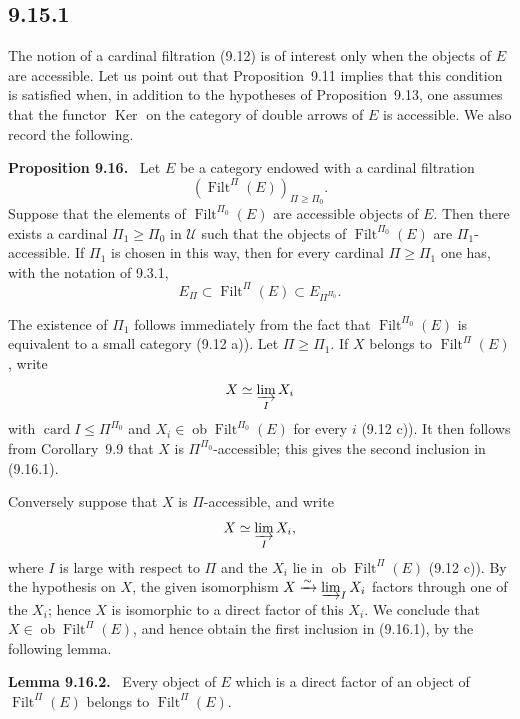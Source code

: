 \documentclass[11pt]{article}
\newcommand{\U}{\mathcal{U}}
\newcommand{\ob}{\operatorname{ob}}
\newcommand{\Filt}{\operatorname{Filt}}
\newcommand{\Ker}{\operatorname{Ker}}
\newcommand{\card}{\operatorname{card}}
\newcommand{\xto}[1]{\xrightarrow{#1}}
\newenvironment{statement}[1]{\par\medskip\noindent\textbf{#1.}\ }{\par\medskip}
\begin{document}
\subsection*{9.15.1}

The notion of a cardinal filtration (9.12) is of interest only when the objects of $E$ are accessible. Let us point out that Proposition~9.11 implies that this condition is satisfied when, in addition to the hypotheses of Proposition~9.13, one assumes that the functor $\Ker$ on the category of double arrows of $E$ is accessible. We also record the following.

\begin{statement}{Proposition 9.16}
Let $E$ be a category endowed with a cardinal filtration
\[
(\Filt^\Pi(E))_{\Pi\geq\Pi_0}.
\]
Suppose that the elements of $\Filt^{\Pi_0}(E)$ are accessible objects of $E$. Then there exists a cardinal $\Pi_1\geq\Pi_0$ in $\U$ such that the objects of $\Filt^{\Pi_0}(E)$ are $\Pi_1$-accessible. If $\Pi_1$ is chosen in this way, then for every cardinal $\Pi\geq\Pi_1$ one has, with the notation of 9.3.1,
\begin{equation}
 E_\Pi\subset \Filt^\Pi(E)\subset E_{\Pi^{\Pi_0}}.
 \tag{9.16.1}
\end{equation}
\end{statement}

The existence of $\Pi_1$ follows immediately from the fact that $\Filt^{\Pi_0}(E)$ is equivalent to a small category (9.12 a)). Let $\Pi\geq\Pi_1$. If $X$ belongs to $\Filt^\Pi(E)$, write
\[
 X\simeq \varinjlim_I X_i
\]
with $\card I\leq\Pi^{\Pi_0}$ and $X_i\in\ob\Filt^{\Pi_0}(E)$ for every $i$ (9.12 c)). It then follows from Corollary~9.9 that $X$ is $\Pi^{\Pi_0}$-accessible; this gives the second inclusion in (9.16.1).

Conversely suppose that $X$ is $\Pi$-accessible, and write
\[
 X\simeq \varinjlim_I X_i,
\]
where $I$ is large with respect to $\Pi$ and the $X_i$ lie in $\ob\Filt^\Pi(E)$ (9.12 c)). By the hypothesis on $X$, the given isomorphism $X\xto{\sim}\varinjlim_I X_i$ factors through one of the $X_i$; hence $X$ is isomorphic to a direct factor of this $X_i$. We conclude that $X\in\ob\Filt^\Pi(E)$, and hence obtain the first inclusion in (9.16.1), by the following lemma.

\begin{statement}{Lemma 9.16.2}
Every object of $E$ which is a direct factor of an object of $\Filt^\Pi(E)$ belongs to $\Filt^\Pi(E)$.
\end{statement}
\end{document}
